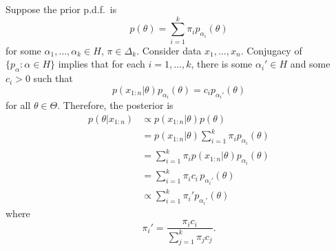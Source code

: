 \documentclass[12pt]{article}
\begin{document}
Suppose the prior p.d.f.\ is
$$p(\theta) =\sum_{i = 1}^k \pi_i p_{\alpha_i}(\theta) $$
for some $\alpha_1,\dotsc,\alpha_k\in H$, $\pi\in\Delta_k$.
Consider data $x_1,\dotsc,x_n$. Conjugacy of $\{ p_\alpha:\alpha\in H\}$ implies that for each $i=1,\dotsc,k$, there is some $\alpha_i'\in H$ and some $c_i > 0$ such that
$$ p(x_{1:n}|\theta) p_{\alpha_i}(\theta) = c_i p_{\alpha_i'}(\theta) $$
for all $\theta\in\Theta$.
Therefore, the posterior is
\begin{align*}
p(\theta|x_{1:n})&\propto p(x_{1:n}|\theta) p(\theta)\\
& = p(x_{1:n}|\theta)\sum_{i = 1}^k \pi_i p_{\alpha_i}(\theta)\\
& = \sum_{i = 1}^k \pi_i p(x_{1:n}|\theta) p_{\alpha_i}(\theta)\\
& =\sum_{i = 1}^k \pi_i c_i \,p_{\alpha_i'}(\theta)\\
&\propto \sum_{i = 1}^k \pi_i' p_{\alpha_i'}(\theta)
\end{align*}
where
$$\pi_i'=\frac{\pi_i c_i}{\sum_{j = 1}^k \pi_j c_j}. $$
\end{document}
